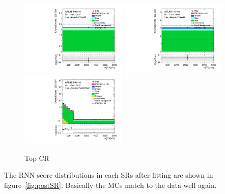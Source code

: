 \begin{figure}[H]
    \centering
    \includegraphics[width=0.45\textwidth]{figures/PostFit/Region_disttagMjj_DCRTopHP_BMin0_J0_incJet1_L1_T0_incFat1_Y6051_incTag1_Fat1_GlobalFit_unconditionnal_mu1}
    \includegraphics[width=0.45\textwidth]{figures/PostFit/Region_disttagMjj_DCRTopLP_BMin0_J0_incJet1_L1_T0_incFat1_Y6051_incTag1_Fat1_GlobalFit_unconditionnal_mu1}
    \includegraphics[width=0.45\textwidth]{figures/PostFit/Region_disttagMjj_DCRTopTight_BMin0_T0_Y6051_incTag1_J2_L1_incJet1_GlobalFit_unconditionnal_mu1log} 
    \caption{Top CR}
    \label{fig:postCRTop}
\end{figure}

The RNN score distributions in each SRs after fitting are shown in figure~\ref{fig:postSR}.
Basically the MCs match to the data well again.

